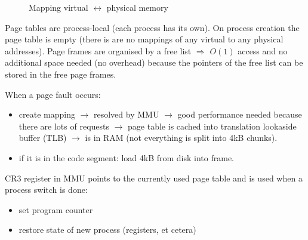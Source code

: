 {\begin{figure}[H]
		\caption{Mapping virtual $\leftrightarrow$ physical memory}
		\label{fig:mappingvirtphysmem}
	\end{figure}
	\par{
		\noindent
		Page tables are process-local (each process has its own). On process creation the page table is empty (there is are no mappings of any virtual to any physical addresses). Page frames are organised by a free list $\Rightarrow$ $O(1)$ access and no additional space needed (no overhead) because the pointers of the free list can be stored in the free page frames.
	}
	\par{
		\noindent\newline When a page fault occurs:
		\parskip0pt\begin{itemize}
			\item{create mapping $\rightarrow$ resolved by MMU $\rightarrow$ good performance needed because there are lots of requests $\rightarrow$ page table is cached into translation lookaside buffer (TLB) $\rightarrow$ is in RAM (not everything is split into 4kB chunks).}
			\item{if it is in the code segment: load 4kB from disk into frame.}
		\end{itemize}
	}
	\par{
		\noindent
		CR3 register in MMU points to the currently used page table and is used when a process switch is done:
		\parskip0pt\begin{itemize}
			\item{set program counter}
			\item{restore state of new process (registers, et cetera)}

\end{itemize}}}
